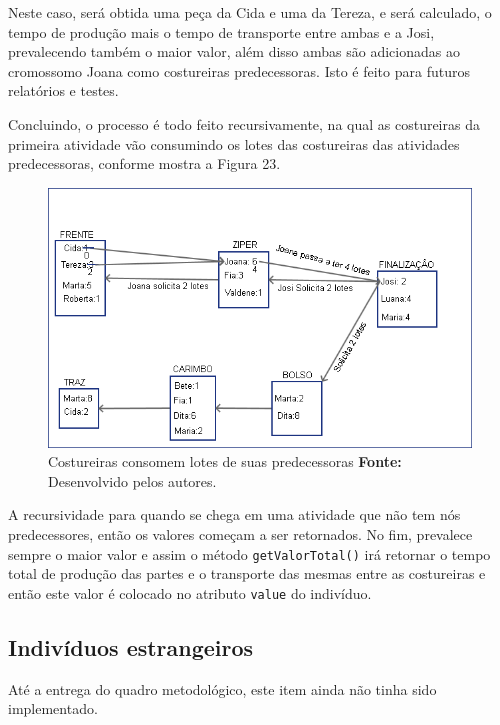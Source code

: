 \newpage

\par Neste caso, será obtida uma peça da Cida e uma da Tereza, e será calculado,
o tempo de produção mais o tempo de transporte entre ambas e a Josi,
prevalecendo também o maior valor, além disso ambas são adicionadas ao
cromossomo Joana como costureiras predecessoras. Isto é feito para futuros relatórios e testes.

\par Concluindo, o processo é todo feito recursivamente, na qual as costureiras
da primeira atividade vão consumindo os lotes das costureiras das atividades predecessoras, conforme mostra a Figura 23.

\newpage

\begin{figure}[h!]
	\centerline{\includegraphics[scale=0.7]{./imagens/processo_solciitacao_de_lotes3.png}}
	\caption[Distribuição de trabalho]
	{Costureiras consomem lotes de suas predecessoras \textbf{Fonte:} Desenvolvido
	pelos autores.}
	\label{fig:exemplo1}
\end{figure}


A recursividade para quando se chega em uma atividade que não tem nós predecessores, então os valores começam a ser retornados. 
No fim, prevalece sempre o maior valor e assim o método \texttt{getValorTotal()} irá retornar o tempo total de 
produção das partes e o transporte das mesmas entre as costureiras e então este valor é colocado no atributo \texttt{value} do 
indivíduo.


\subsection{Indivíduos estrangeiros}
\par Até a entrega do quadro metodológico, este item ainda não tinha sido implementado.
  
